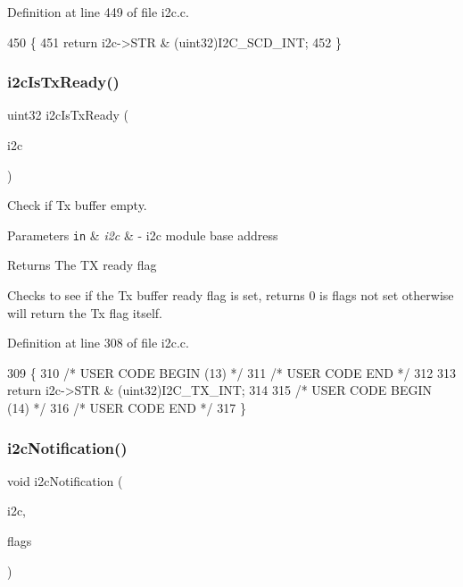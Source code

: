 Definition at line 449 of file i2c.\+c.


\begin{DoxyCode}
450 \{
451     \textcolor{keywordflow}{return} i2c->STR & (uint32)I2C\_SCD\_INT;
452 \}
\end{DoxyCode}
\mbox{\label{group__I2C_ga8ae545c7c63f15274a92191efbd81ed4}} 
\subsubsection{\texorpdfstring{i2c\+Is\+Tx\+Ready()}{i2cIsTxReady()}}
{\footnotesize\ttfamily uint32 i2c\+Is\+Tx\+Ready (\begin{DoxyParamCaption}\item[{\mbox{\hyperlink{reg__i2c_8h_a5d6c119fb20e803a530d0d4df544daf7}{i2c\+B\+A\+S\+E\+\_\+t}} $\ast$}]{i2c }\end{DoxyParamCaption})}



Check if Tx buffer empty. 


\begin{DoxyParams}[1]{Parameters}
\mbox{\tt in}  & {\em i2c} & -\/ i2c module base address\\
\hline
\end{DoxyParams}
\begin{DoxyReturn}{Returns}
The TX ready flag
\end{DoxyReturn}
Checks to see if the Tx buffer ready flag is set, returns 0 is flags not set otherwise will return the Tx flag itself. 

Definition at line 308 of file i2c.\+c.


\begin{DoxyCode}
309 \{
310 \textcolor{comment}{/* USER CODE BEGIN (13) */}
311 \textcolor{comment}{/* USER CODE END */}
312 
313     \textcolor{keywordflow}{return} i2c->STR & (uint32)I2C\_TX\_INT;
314 
315 \textcolor{comment}{/* USER CODE BEGIN (14) */}
316 \textcolor{comment}{/* USER CODE END */}
317 \}
\end{DoxyCode}
\mbox{\label{group__I2C_ga5ecfeeec39ad8a6788eade4f0c89eb62}} 
\subsubsection{\texorpdfstring{i2c\+Notification()}{i2cNotification()}}
{\footnotesize\ttfamily void i2c\+Notification (\begin{DoxyParamCaption}\item[{\mbox{\hyperlink{reg__i2c_8h_a5d6c119fb20e803a530d0d4df544daf7}{i2c\+B\+A\+S\+E\+\_\+t}} $\ast$}]{i2c,  }\item[{uint32}]{flags }\end{DoxyParamCaption})}



